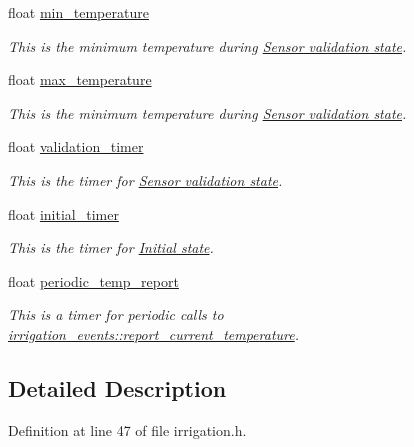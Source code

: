 \begin{DoxyCompactItemize}
\item 
float \hyperlink{structirrigation__controller__status_a451e58983d5995bf6f1e00f9318d5dd6}{min\+\_\+temperature}
\begin{DoxyCompactList}\small\item\em This is the minimum temperature during \hyperlink{group__state__validate}{Sensor validation state}. \end{DoxyCompactList}\item 
float \hyperlink{structirrigation__controller__status_a1bd8f83a44ee01d3b7cf3851b6716f02}{max\+\_\+temperature}
\begin{DoxyCompactList}\small\item\em This is the minimum temperature during \hyperlink{group__state__validate}{Sensor validation state}. \end{DoxyCompactList}\item 
float \hyperlink{structirrigation__controller__status_a360e7ee7f6ac54635fc66035883d2d9c}{validation\+\_\+timer}
\begin{DoxyCompactList}\small\item\em This is the timer for \hyperlink{group__state__validate}{Sensor validation state}. \end{DoxyCompactList}\item 
float \hyperlink{structirrigation__controller__status_a9d70c74fe395ec2720089b929a32e1e9}{initial\+\_\+timer}
\begin{DoxyCompactList}\small\item\em This is the timer for \hyperlink{group__state__init}{Initial state}. \end{DoxyCompactList}\item 
float \hyperlink{structirrigation__controller__status_aab428bb9e677098d336aefd32b5e6232}{periodic\+\_\+temp\+\_\+report}
\begin{DoxyCompactList}\small\item\em This is a timer for periodic calls to \hyperlink{structirrigation__events_a47b81edd52377b4c4e1ed512b830e237}{irrigation\+\_\+events\+::report\+\_\+current\+\_\+temperature}. \end{DoxyCompactList}\end{DoxyCompactItemize}


\subsection{Detailed Description}


Definition at line 47 of file irrigation.\+h.




